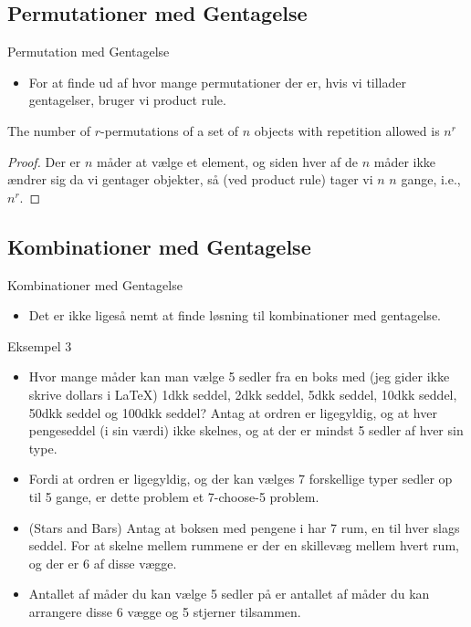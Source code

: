 \documentclass{beamer}
\begin{document}
\subsection{Permutationer med Gentagelse}
\begin{frame}{Permutation med Gentagelse}
   \begin{itemize}
       \item For at finde ud af hvor mange permutationer der er, hvis vi tillader gentagelser, bruger vi product rule.
   \end{itemize} 
   \begin{theorem}
       The number of $r$-permutations of a set of $n$ objects with repetition allowed is $n^r$
   \end{theorem}
   \begin{proof}
       Der er $n$ måder at vælge et element, og siden hver af de $n$ måder ikke ændrer sig da vi gentager objekter, så (ved product rule) tager vi $n$ $n$ gange, i.e., $n^r$. 
   \end{proof}
\end{frame}

\subsection{Kombinationer med Gentagelse}

\begin{frame}{Kombinationer med Gentagelse}
   \begin{itemize}
       \item Det er ikke ligeså nemt at finde løsning til kombinationer med gentagelse. 
   \end{itemize} 
\end{frame}

\begin{frame}[allowframebreaks]{Eksempel 3}
   \begin{itemize}
       \item<1-> Hvor mange måder kan man vælge 5 sedler fra en boks med (jeg gider ikke skrive dollars i \LaTeX) 1dkk seddel, 2dkk seddel, 5dkk seddel, 10dkk seddel, 50dkk seddel og 100dkk seddel? Antag at ordren er ligegyldig, og at hver pengeseddel (i sin værdi) ikke skelnes, og at der er mindst 5 sedler af hver sin type.
       \item<2-> Fordi at ordren er ligegyldig, og der kan vælges 7 forskellige typer sedler op til 5 gange, er dette problem et 7-choose-5 problem. 
       \item<2-> (Stars and Bars) Antag at boksen med pengene i har 7 rum, en til hver slags seddel. For at skelne mellem rummene er der en skillevæg mellem hvert rum, og der er 6 af disse vægge.
       \item<2-> Antallet af måder du kan vælge 5 sedler på er antallet af måder du kan arrangere disse 6 vægge og 5 stjerner tilsammen. 
   \end{itemize} 
\end{frame}
\end{document}
